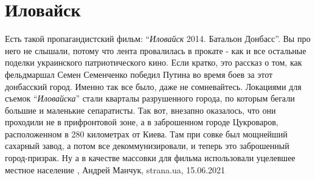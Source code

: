  
 
 
 
 
\chapter{Иловайск}

Есть такой пропагандистский фильм: \enquote{\emph{Иловайск} 2014. Батальон
Донбасс}. Вы про него не слышали, потому что лента провалилась в прокате - как
и все остальные поделки украинского патриотического кино. Если кратко, это
рассказ о том, как фельдмаршал Семен Семенченко победил Путина во время боев за
этот донбасский город. Именно так все было, даже не сомневайтесь.  Локациями
для съемок \enquote{\emph{Иловайска}} стали кварталы разрушенного города, по
которым бегали большие и маленькие сепаратисты. Так вот, внезапно оказалось,
что они проходили не в прифронтовой зоне, а в заброшенном городе Цукроваров,
расположенном в 280 километрах от Киева. Там при совке был мощнейший сахарный
завод, а потом все декоммунизировали, и теперь это заброшенный город-призрак.
Ну а в качестве массовки для фильма использовали уцелевшее местное население
, 
Андрей Манчук, strana.ua, 15.06.2021


